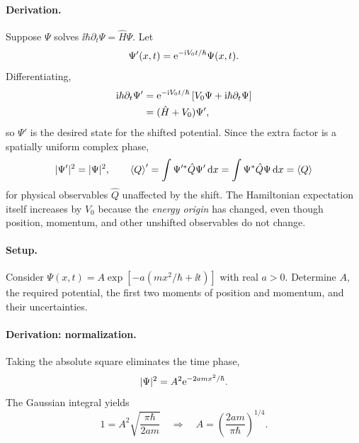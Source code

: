 \paragraph{Derivation.}
Suppose $\Psi$ solves $\ii\hbar\partial_t\Psi=\hat H\Psi$. Let
\begin{equation}
\Psi'(x,t)=\mathrm{e}^{-\mathrm{i} V_0t/\hbar}\Psi(x,t).
\end{equation}
Differentiating,
\begin{align}
\mathrm{i}\hbar\partial_t\Psi'
&=\mathrm{e}^{-\mathrm{i} V_0t/\hbar}
\left[V_0\Psi+\mathrm{i}\hbar\partial_t\Psi\right]\\
&=(\hat H+V_0)\Psi',
\end{align}
so $\Psi'$ is the desired state for the shifted potential. Since the extra factor is a spatially uniform complex phase,
\begin{equation}
|\Psi'|^2=|\Psi|^2,\qquad
\left\langle Q\right\rangle'=\int\Psi'^*\hat Q\Psi'\,\mathrm{d} x
=\int\Psi^*\hat Q\Psi\,\mathrm{d} x=\left\langle Q\right\rangle
\end{equation}
for physical observables $\hat Q$ unaffected by the shift. The Hamiltonian expectation itself increases by $V_0$ because the \emph{energy origin} has changed, even though position, momentum, and other unshifted observables do not change.

\paragraph{Setup.} Consider $\Psi(x,t)=A\exp[-a(mx^2/\hbar+\ii t)]$ with real $a>0$. Determine $A$, the required potential, the first two moments of position and momentum, and their uncertainties.
\paragraph{Derivation: normalization.}
Taking the absolute square eliminates the time phase,
\begin{equation}
|\Psi|^2=A^2\mathrm{e}^{-2amx^2/\hbar}.
\end{equation}
The Gaussian integral yields
\begin{equation}
1=A^2\sqrt{\frac{\pi\hbar}{2am}}
\quad\Rightarrow\quad
\boxed{A=\left(\frac{2am}{\pi\hbar}\right)^{1/4}}.
\end{equation}
